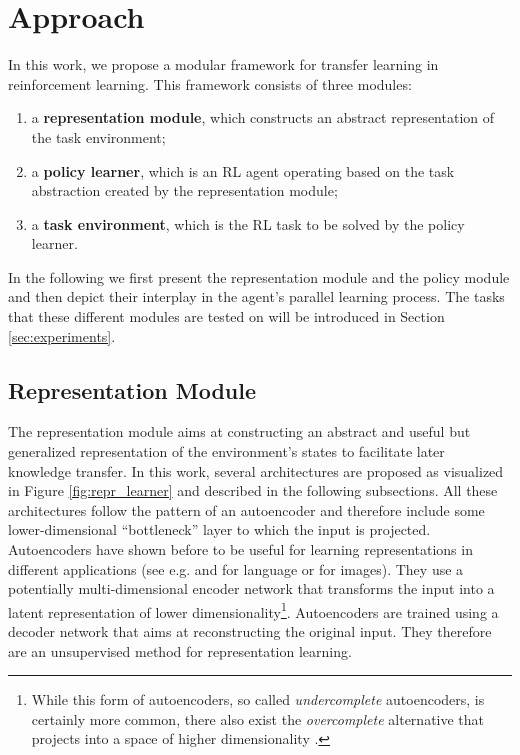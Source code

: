 
\section{Approach}
\label{sec:approach}
In this work, we propose a modular framework for transfer learning in reinforcement learning. 
This framework consists of three modules: 
\begin{enumerate}[i]
    \item a \textbf{representation module}, which constructs an abstract representation of the task environment;
    \item a \textbf{policy learner}, which is an RL agent operating based on the task abstraction created by the representation module;
    \item a \textbf{task environment}, which is the RL task to be solved by the policy learner.
\end{enumerate}
In the following we first present the representation module and the policy module and then depict their interplay in the agent's parallel learning process. The tasks that these different modules are tested on will be introduced in Section \ref{sec:experiments}.

\subsection{Representation Module}
The representation module aims at constructing an abstract and useful but generalized representation of the environment's states to facilitate later knowledge transfer.
In this work, several architectures are proposed as visualized in Figure \ref{fig:repr_learner} and described in the following subsections. 
All these architectures follow the pattern of an autoencoder \citep{ballard1987modular} and therefore include some lower-dimensional ``bottleneck'' layer to which the input is projected. Autoencoders have shown before to be useful for learning representations \citep{bengio2012deep} in different applications (see e.g. \citet{ap2014autoencoder} and \citet{silberer2014learning} for language or \citet{wang2013learning} for images). They use a potentially multi-dimensional encoder network that transforms the input into a latent representation of lower dimensionality\footnote{While this form of autoencoders, so called \textit{undercomplete} autoencoders, is certainly more common, there also exist the \textit{overcomplete} alternative that projects into a space of higher dimensionality \citep{goodfellow2016deep}.}. Autoencoders are trained using a decoder network that aims at reconstructing the original input. They therefore are an unsupervised method for representation learning. 

